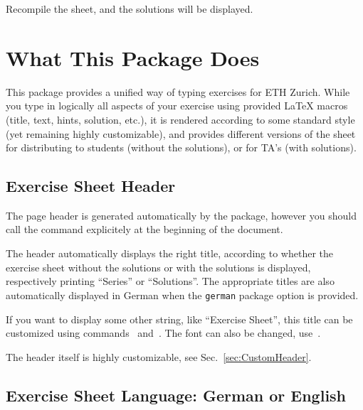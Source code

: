 \documentclass[11pt,a4paper]{article}
\begin{document}
Recompile the sheet, and the solutions will be displayed.


\section{What This Package Does}

This package provides a unified way of typing exercises for ETH Zurich. While you type in
logically all aspects of your exercise using provided \LaTeX{} macros (title, text, hints,
solution, etc.), it is rendered according to some standard style (yet remaining highly
customizable), and provides different versions of the sheet for distributing to students
(without the solutions), or for TA's (with solutions).

\subsection{Exercise Sheet Header}
\label{sec:Header}

The page header is generated automatically by the package, however you should call the
command  explicitely at the beginning of the document.


The header automatically displays the right title, according to whether the exercise sheet
without the solutions or with the solutions is displayed, respectively printing ``Series''
or ``Solutions''. The appropriate titles are also automatically displayed in German when
the \texttt{german} package option is provided.

\begin{pkgtip}
  If you want to display some other string,
  like ``Exercise Sheet'', this title can be customized using
  commands~ and~. The
  font can also be changed, use~.

  The header itself is highly customizable, see Sec.~\ref{sec:CustomHeader}.
\end{pkgtip}


\subsection{Exercise Sheet Language: German or English}
\label{sec:Language}
\end{document}
